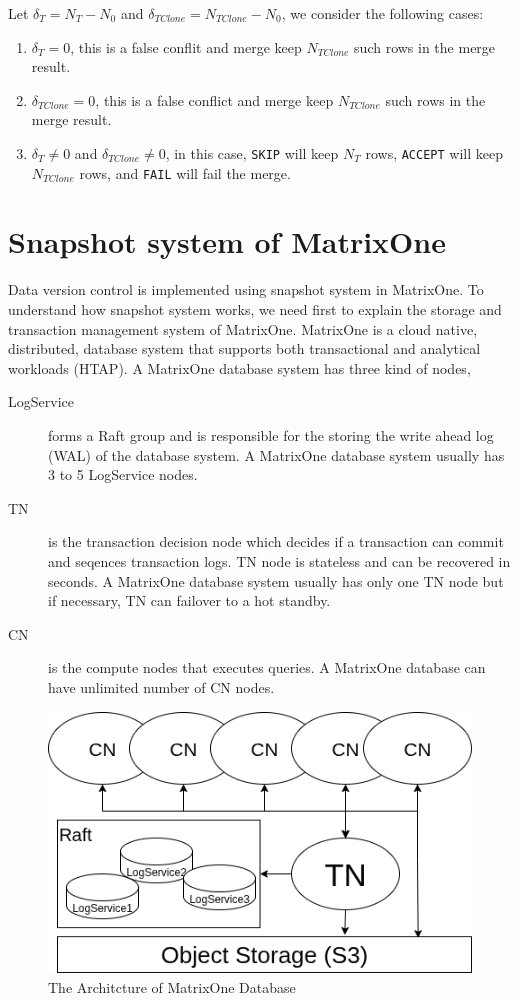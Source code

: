\documentclass[sigconf,nonacm]{acmart} %
\begin{document}
Let $\delta_T = N_T - N_0$ and $\delta_{TClone} = N_{TClone} - N_0$, we consider the following cases:
\begin{enumerate}
\item $\delta_T = 0$, this is a false conflit and 
merge keep $N_{TClone}$ such rows in the merge result.
\item $\delta_{TClone} = 0$, this is a false conflict and 
merge keep $N_{TClone}$ such rows in the merge result.
\item $\delta_T \neq 0$ and $\delta_{TClone} \neq 0$, in this case, \texttt{SKIP}
will keep $N_T$ rows, \texttt{ACCEPT} will keep $N_{TClone}$ rows, and 
\texttt{FAIL} will fail the merge.
\end{enumerate}

\section{Snapshot system of MatrixOne}

Data version control is implemented using snapshot system in MatrixOne.
To understand how snapshot system works, we need first to explain 
the storage and transaction management system of MatrixOne.  MatrixOne 
is a cloud native, distributed, database system that supports both transactional
and analytical workloads (HTAP).  A MatrixOne database system has three 
kind of nodes, 
\begin{description}
\item[LogService] forms a Raft group and is responsible for the storing the write ahead log (WAL) 
of the database system.  A MatrixOne database system usually has 3 to 5 LogService nodes.
\item[TN] is the transaction decision node which decides if a transaction can commit and 
seqences transaction logs.  TN node is stateless and can be recovered in seconds.  A MatrixOne 
database system usually has only one TN node but if necessary, TN can failover to a hot standby. 
\item[CN] is the compute nodes that executes queries.  A MatrixOne database can have unlimited
number of CN nodes.
\end{description}
\begin{figure}[h]
  \centering
  \includegraphics[width=\linewidth]{m1a}
  \caption{The Architcture of MatrixOne Database}
\end{figure}
\end{document}
